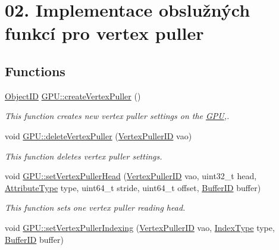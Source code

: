 \hypertarget{group__vertexpuller__tasks}{}\section{02. Implementace obslužných funkcí pro vertex puller}
\label{group__vertexpuller__tasks}
\subsection*{Functions}
\begin{DoxyCompactItemize}
\item 
\hyperlink{fwd_8hpp_af56aa505d50bcd62e9e9c5a72564af4d}{Object\+ID} \hyperlink{group__vertexpuller__tasks_gaabe965c10fea7cd8f8af3aa528915c92}{G\+P\+U\+::create\+Vertex\+Puller} ()
\begin{DoxyCompactList}\small\item\em This function creates new vertex puller settings on the \hyperlink{classGPU}{G\+PU},. \end{DoxyCompactList}\item 
void \hyperlink{group__vertexpuller__tasks_gadf91a9fec77d8d23f093458b36a733fc}{G\+P\+U\+::delete\+Vertex\+Puller} (\hyperlink{fwd_8hpp_af6f78f73099477c9ce5537d657597486}{Vertex\+Puller\+ID} vao)
\begin{DoxyCompactList}\small\item\em This function deletes vertex puller settings. \end{DoxyCompactList}\item 
void \hyperlink{group__vertexpuller__tasks_gae9ffbcfa3b43ac9b3ea53e5bc44f83cc}{G\+P\+U\+::set\+Vertex\+Puller\+Head} (\hyperlink{fwd_8hpp_af6f78f73099477c9ce5537d657597486}{Vertex\+Puller\+ID} vao, uint32\+\_\+t head, \hyperlink{fwd_8hpp_a349a9cde14be8097df865ba0469c0ab2}{Attribute\+Type} type, uint64\+\_\+t stride, uint64\+\_\+t offset, \hyperlink{fwd_8hpp_a5114031b77b80ad895eff688720b7f93}{Buffer\+ID} buffer)
\begin{DoxyCompactList}\small\item\em This function sets one vertex puller reading head. \end{DoxyCompactList}\item 
void \hyperlink{group__vertexpuller__tasks_gae5238dbc60eb2ece94df110945a4f46b}{G\+P\+U\+::set\+Vertex\+Puller\+Indexing} (\hyperlink{fwd_8hpp_af6f78f73099477c9ce5537d657597486}{Vertex\+Puller\+ID} vao, \hyperlink{fwd_8hpp_a2bfb0a0ff1c379a8b4e8f9d24fdd4839}{Index\+Type} type, \hyperlink{fwd_8hpp_a5114031b77b80ad895eff688720b7f93}{Buffer\+ID} buffer)

\end{DoxyCompactItemize}
